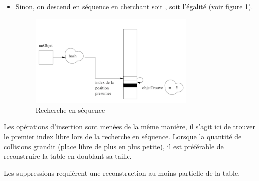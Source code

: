 \begin{itemize}
\item Sinon, on descend en s\'equence en cherchant soit , soit
l'\'egalit\'e (voir figure \ref{fig:hash3}).

\begin{figure}[hbtp]
\begin{center} 
\includegraphics[width=8cm]{hash3} 
\caption{Recherche en s\'equence}
\label{fig:hash3}
\end{center} 
\end{figure} 
\end{itemize}

Les op\'erations d'insertion sont men\'ees de la m\^eme mani\`ere, il s'agit ici
de trouver le premier index libre lors de la recherche en s\'equence. Lorsque
la quantit\'e de collisions grandit (place libre de plus en plus petite),
il est pr\'ef\'erable de reconstruire la table en doublant sa taille.


Les suppressions requi\`erent une reconstruction au moins partielle de la table.

\ifx\wholebook\relax\else\fi
